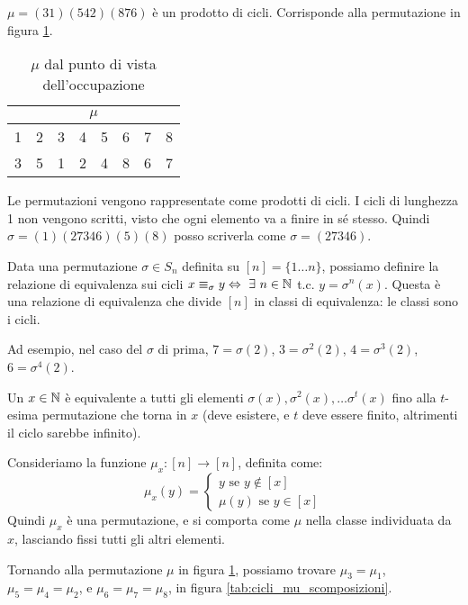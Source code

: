 $\mu = (3 1) (5 4 2) (8 7 6)$ \`e un prodotto di cicli. Corrisponde alla permutazione in figura \ref{tab:cicli_mu_occupazione}.

\begin{table}[ht]
\centering
\begin{tabular}{*{8}{c}}
\multicolumn{8}{c}{$\mu$} \\
\hline
1 & 2 & 3 & 4 & 5 & 6 & 7 & 8 \\
3 & 5 & 1 & 2 & 4 & 8 & 6 & 7
\end{tabular}
\caption{$\mu$ dal punto di vista dell'occupazione\label{tab:cicli_mu_occupazione}}
\end{table}

Le permutazioni vengono rappresentate come prodotti di cicli. I cicli di lunghezza 1 non vengono scritti, visto che ogni elemento va a finire in s\'e stesso. Quindi $\sigma = (1) (2 7 3 4 6) (5) (8)$ posso scriverla come $\sigma = (2 7 3 4 6)$.

Data una permutazione $\sigma \in S_n$ definita su $[n] = \{1 \dots n\}$, possiamo definire la relazione di equivalenza sui cicli $x \equiv_{\sigma} y \iff \exists n \in \naturals $ t.c. $ y = \sigma^{n} (x)$. Questa \`e una relazione di equivalenza che divide $[n]$ in classi di equivalenza: le classi sono i cicli.

Ad esempio, nel caso del $\sigma$ di prima, $7 = \sigma (2)$, $3 = \sigma^{2}(2)$, $4 = \sigma^{3} (2)$, $6 = \sigma^{4} (2)$.

Un $x \in \mathbb{N}$ \`e equivalente a tutti gli elementi $\sigma (x), \sigma^{2} (x), \dots \sigma^{t}(x)$ fino alla $t$-esima permutazione che torna in $x$ (deve esistere, e $t$ deve essere finito, altrimenti il ciclo sarebbe infinito).

Consideriamo la funzione $\mu_x : [n] \to [n]$, definita come:
\[
\mu_x (y) =
\begin{cases}
y \text{ se } y \notin [x] \\
\mu (y) \text{ se } y \in [x]
\end{cases}
\]
Quindi $\mu_x$ \`e una permutazione, e si comporta come $\mu$ nella classe individuata da $x$, lasciando fissi tutti gli altri elementi.

Tornando alla permutazione $\mu$ in figura \ref{tab:cicli_mu_occupazione}, possiamo trovare $\mu_3 = \mu_1$, $\mu_5 = \mu_4 = \mu_2$, e $\mu_6 = \mu_7 = \mu_8$, in figura \ref{tab:cicli_mu_scomposizioni}.

